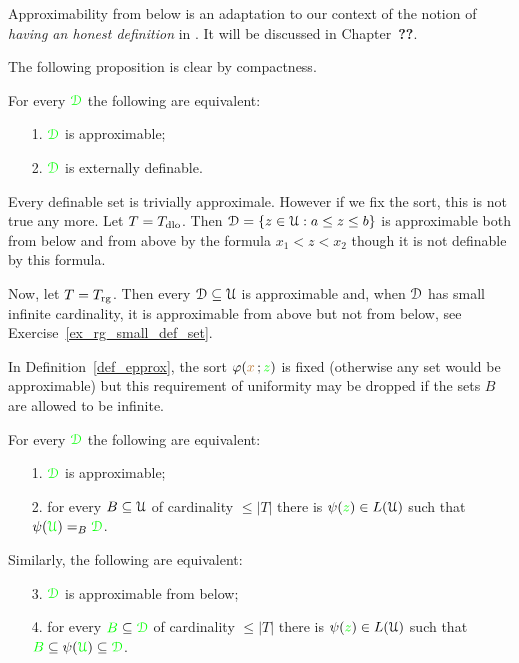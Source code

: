 \documentclass[creche.tex]{subfiles}
\begin{document}
Approximability from below is an adaptation to our context of the notion of \textit{having an honest definition} in \cite{CS}.  It will be discussed in Chapter~\textbf{??}.

The following proposition is clear by compactness.

\begin{proposition}\label{lem_approx=external}
For every ${\color{green}\EuScript D}$ the following are equivalent:
\begin{itemize}
\item[1.] ${\color{green}\EuScript D}$ is approximable;
\item[2.] ${\color{green}\EuScript D}$ is externally definable.\QED 
\end{itemize}
\end{proposition}

\begin{example}
Every definable set is trivially approximale. However if we fix the sort, this is not true any more. Let $T=T_{\rm dlo}$. Then $\EuScript D=\{z\in\EuScript U:a\le z\le b\}$ is approximable both from below and from above by the formula $x_1<z<x_2$ though it is not definable by this formula.

Now, let $T=T_{\rm rg}$. Then every $\EuScript D\subseteq\EuScript U$ is approximable and, when $\EuScript D$ has small infinite cardinality, it is approximable from above but not from below, see Exercise~\ref{ex_rg_small_def_set}.\QED
\end{example}

In Definition~\ref{def_epprox}, the sort $\varphi({\color{brown} x}\,;{\color{green} z})$ is fixed (otherwise any set would be approximable) but this requirement of uniformity may be dropped if the sets $B$ are allowed to be infinite.

\begin{proposition}\label{lem_approx_nonunif}
For every ${\color{green}\EuScript D}$ the following are equivalent:
\begin{itemize}
\item[1.] ${\color{green}\EuScript D}$ is approximable;
\item[2.] for every $B\subseteq\EuScript U$ of cardinality $\le|T|$ there is $\psi({\color{green} z})\in L(\EuScript U)$ such that $\psi({\color{green}\EuScript U})=_B{\color{green}\EuScript D}$.
\end{itemize}
Similarly, the following are equivalent:
\begin{itemize}
\item[3.] ${\color{green}\EuScript D}$ is approximable from below;
\item[4.]  for every ${\color{green} B}\subseteq{\color{green}\EuScript D}$ of cardinality $\le|T|$ there is $\psi({\color{green} z})\in L(\EuScript U)$ such that ${\color{green} B}\subseteq \psi({\color{green}\EuScript U})\subseteq{\color{green}\EuScript D}$.
\end{itemize}
\end{proposition}
\end{document}
